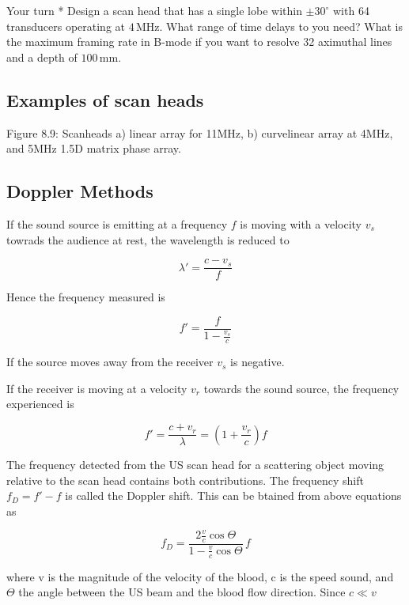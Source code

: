 \documentclass{article}
\begin{document}
Your turn * Design a scan head that has a single lobe within
\(\pm 30^\circ\) with 64 transducers operating at \(4\,\)MHz. What range
of time delays to you need? What is the maximum framing rate in B-mode
if you want to resolve 32 aximuthal lines and a depth of \(100\,\)mm.

\subsection{Examples of scan heads}\label{examples-of-scan-heads}

Figure 8.9: Scanheads a) linear array for 11MHz, b) curvelinear array at
4MHz, and 5MHz 1.5D matrix phase array.
\subsection{Doppler Methods}\label{doppler-methods}

If the sound source is emitting at a frequency \(f\) is moving with a
velocity \(v_s\) towrads the audience at rest, the wavelength is reduced
to

\begin{equation}
\lambda'=\frac{c-v_s}{f}
\end{equation}

Hence the frequency measured is

\begin{equation}
f'=\frac{f}{1-\frac{v_s}{c}}
\end{equation}

If the source moves away from the receiver \(v_s\) is negative.

If the receiver is moving at a velocity \(v_r\) towards the sound
source, the frequency experienced is

\begin{equation}
f'=\frac{c+v_r}{\lambda}=\left(1+\frac{v_r}{c}\right) f
\end{equation}

The frequency detected from the US scan head for a scattering object
moving relative to the scan head contains both contributions. The
frequency shift \(f_D=f'-f\) is called the Doppler shift. This can be
btained from above equations as

\begin{equation}
f_D=\frac{2\frac{v}{c}\cos\Theta}{1-\frac{v}{c}\cos \Theta}\,f
\end{equation}

where v is the magnitude of the velocity of the blood, c is the speed
sound, and \(\Theta\) the angle between the US beam and the blood flow
direction. Since \(c\ll v\)
\end{document}
